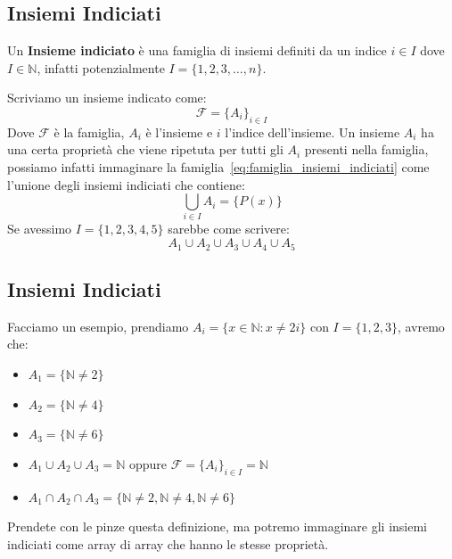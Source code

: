 \documentclass{article}
\begin{document}
\subsection{Insiemi Indiciati}\label{sec:insiemi_indiciati}
Un \textbf{Insieme indiciato} è una famiglia di insiemi definiti da un indice $i \in I$ dove $I \in \mathbb{N}$, infatti potenzialmente $I = \{1,2,3,\ldots,n\}$. \par
Scriviamo un insieme indicato come:
\begin{equation}\label{eq:famiglia_insiemi_indiciati}
        \mathcal{F} = {\{A_i\}}_{i \in I}
\end{equation} 
Dove $\mathcal{F}$ è la famiglia, $A_i$ è l'insieme e $i$ l'indice dell'insieme. \newline
Un insieme $A_i$ ha una certa proprietà che viene ripetuta per tutti gli $A_i$ presenti nella famiglia, possiamo infatti immaginare la famiglia~\ref{eq:famiglia_insiemi_indiciati} come l'unione degli insiemi indiciati che contiene:
\begin{equation*}
        \bigcup_{i \in I}A_i = \{P(x)\}
\end{equation*}
Se avessimo $I = \{1,2,3,4,5\}$ sarebbe come scrivere:
\begin{equation*}
        A_1 \cup A_2 \cup A_3 \cup A_4 \cup A_5
\end{equation*}



\subsection{Insiemi Indiciati}

Facciamo un esempio, prendiamo $A_i = \{x \in \mathbb{N} : x \not = 2i\}$ con $I = \{1,2,3\}$, avremo che:
\begin{itemize}
        \item $A_1 = \{\mathbb{N} \not = 2\}$
        \item $A_2 = \{\mathbb{N} \not = 4\}$
        \item $A_3 = \{\mathbb{N} \not = 6\}$
        \item $A_1 \cup A_2 \cup A_3 = \mathbb{N}$ oppure $\mathcal{F} = {\{A_i\}}_{i \in I} = \mathbb{N}$
        \item $A_1 \cap A_2 \cap A_3 = \{\mathbb{N} \not = 2, \mathbb{N} \not = 4, \mathbb{N} \not = 6\}$
\end{itemize}

Prendete con le pinze questa definizione, ma potremo immaginare gli insiemi indiciati come array di array che hanno le stesse proprietà.
\end{document}
